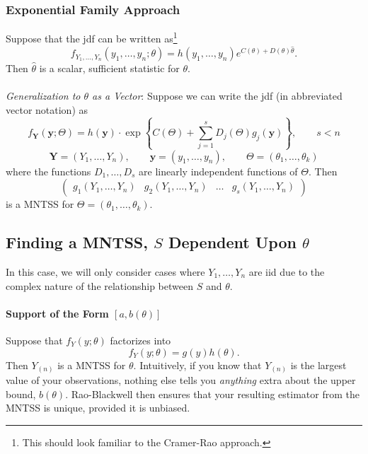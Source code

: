 \documentclass[a4paper,12pt]{scrartcl}
\begin{document}
\subsubsection{Exponential Family Approach}

Suppose that the jdf can be written as\footnote{This should look
familiar to the Cramer-Rao approach.}
   \[ f_{Y_1, \ldots, Y_n}(y_1, \ldots, y_n; \theta)=h(y_1, \ldots, y_n)
      e^{C(\theta) + D(\theta) \hat{\theta}}.\]
Then $\hat{\theta}$ is a scalar, sufficient statistic for $\theta$.
\\
\\
{\sl Generalization to $\theta$ as a Vector}: Suppose we can write the
jdf (in abbreviated vector notation) as
\[ f_{\mathbf{Y}}(\mathbf{y}; \Theta)
      = h(\mathbf{y})\cdot
      \exp\left\{ {C(\Theta) + \sum^s_{j=1}
      D_j(\Theta) g_j(\mathbf{y}) }\right\}, \qquad s < n
	 \]
\[ \mathbf{Y} = (Y_1, \ldots, Y_n), \qquad
   \mathbf{y} = (y_1, \ldots, y_n),
   \qquad \Theta = (\theta_1, \ldots, \theta_k) \]
where the functions $D_1, \ldots, D_s$ are linearly independent functions
of $\Theta$. Then
\[ \begin{pmatrix} g_1(Y_1, \ldots, Y_n) & g_2(Y_1, \ldots, Y_n) & \ldots
      & g_s(Y_1, \ldots, Y_n) \end{pmatrix} \]
is a MNTSS for $\Theta = (\theta_1, \ldots, \theta_k)$.


\newpage
\subsection{Finding a MNTSS, $S$ Dependent Upon $\theta$}

In this case, we will only consider cases where $Y_1, \ldots, Y_n$
are iid due to the complex nature of the relationship between
$S$ and $\theta$.


\paragraph{Support of the Form $[a, b(\theta)]$}
Suppose that $f_Y(y; \theta)$ factorizes into
   \[ f_Y(y; \theta) = g(y) h(\theta).\]
Then $Y_{(n)}$ is a MNTSS for $\theta$. Intuitively, if you know
that $Y_{(n)}$ is the largest value of your observations, nothing
else tells you \emph{anything} extra about the upper bound, $b(\theta)$.
Rao-Blackwell then ensures that your resulting estimator from the
MNTSS is unique, provided it is unbiased.
\end{document}
